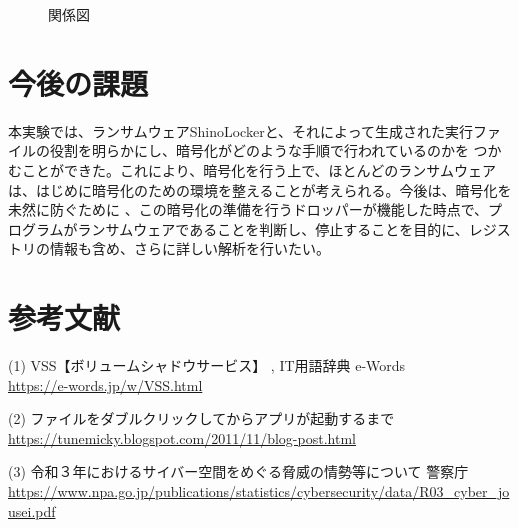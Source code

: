 \documentclass[dvipdfmx,autodetect-engine]{jsarticle}
\begin{document}
  \begin{figure}[H]
    \centering
    \caption{関係図}
  \end{figure}


\section{今後の課題}
本実験では、ランサムウェアShinoLockerと、それによって生成された実行ファイルの役割を明らかにし、暗号化がどのような手順で行われているのかを
つかむことができた。これにより、暗号化を行う上で、ほとんどのランサムウェアは、はじめに暗号化のための環境を整えることが考えられる。今後は、暗号化を未然に防ぐために
、この暗号化の準備を行うドロッパーが機能した時点で、プログラムがランサムウェアであることを判断し、停止することを目的に、レジストリの情報も含め、さらに詳しい解析を行いたい。
\section{参考文献}

(1) VSS【ボリュームシャドウサービス】 , IT用語辞典 e-Words  \\
\qquad\quad \url{https://e-words.jp/w/VSS.html}

(2) ファイルをダブルクリックしてからアプリが起動するまで \\
\qquad\quad \url{https://tunemicky.blogspot.com/2011/11/blog-post.html}

(3) 令和３年におけるサイバー空間をめぐる脅威の情勢等について 警察庁\\
\qquad\quad \url{https://www.npa.go.jp/publications/statistics/cybersecurity/data/R03_cyber_jousei.pdf}
\end{document}
